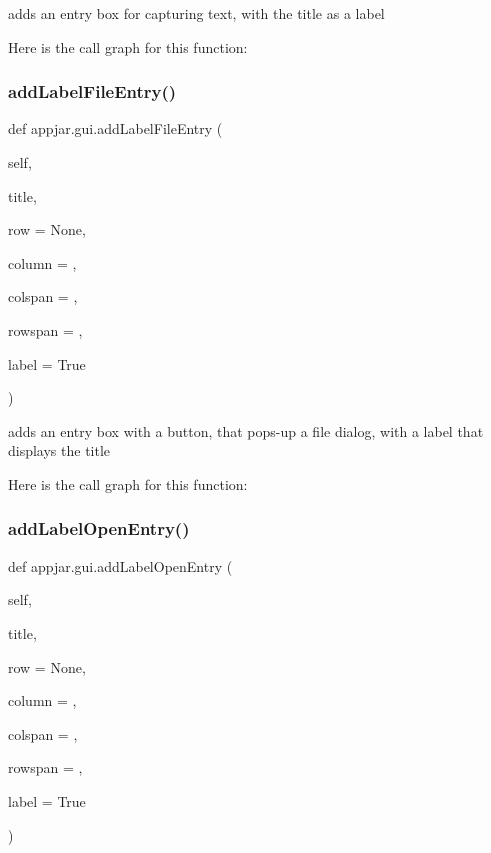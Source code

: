 \begin{DoxyVerb}adds an entry box for capturing text, with the title as a label \end{DoxyVerb}
 Here is the call graph for this function\+:
\mbox{\label{classappjar_1_1gui_ae3d8091593d454afa3953083aa079cf4}} 
\subsubsection{\texorpdfstring{add\+Label\+File\+Entry()}{addLabelFileEntry()}}
{\footnotesize\ttfamily def appjar.\+gui.\+add\+Label\+File\+Entry (\begin{DoxyParamCaption}\item[{}]{self,  }\item[{}]{title,  }\item[{}]{row = {\ttfamily None},  }\item[{}]{column = {},  }\item[{}]{colspan = {},  }\item[{}]{rowspan = {},  }\item[{}]{label = {\ttfamily True} }\end{DoxyParamCaption})}

\begin{DoxyVerb}adds an entry box with a button, that pops-up a file dialog, with a label that displays the title \end{DoxyVerb}
 Here is the call graph for this function\+:
\mbox{\label{classappjar_1_1gui_a262ff9363b1c10e2a7c34f03b019ce19}} 
\subsubsection{\texorpdfstring{add\+Label\+Open\+Entry()}{addLabelOpenEntry()}}
{\footnotesize\ttfamily def appjar.\+gui.\+add\+Label\+Open\+Entry (\begin{DoxyParamCaption}\item[{}]{self,  }\item[{}]{title,  }\item[{}]{row = {\ttfamily None},  }\item[{}]{column = {},  }\item[{}]{colspan = {},  }\item[{}]{rowspan = {},  }\item[{}]{label = {\ttfamily True} }\end{DoxyParamCaption})}

